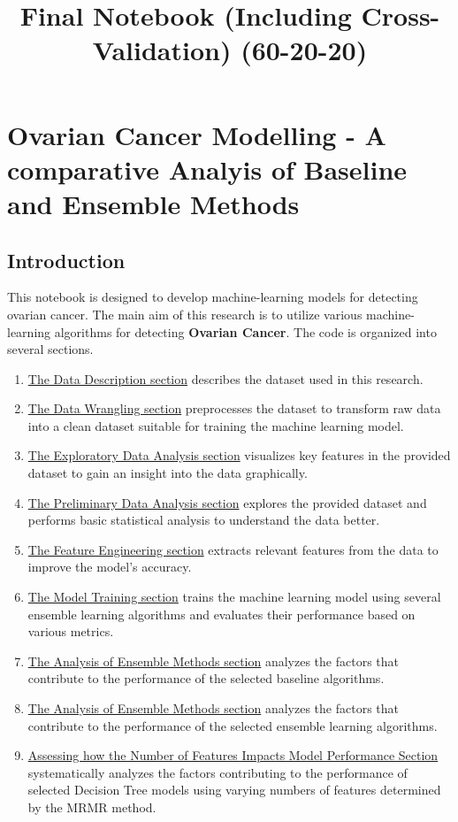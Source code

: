\documentclass[11pt]{article}
\title{Final Notebook (Including Cross-Validation) (60-20-20)}
\begin{document}
    
    \maketitle
    
    

    
    \section{Ovarian Cancer Modelling - A comparative Analyis of Baseline
and Ensemble
Methods}\label{ovarian-cancer-modelling---a-comparative-analyis-of-baseline-and-ensemble-methods}

    \subsection{Introduction}\label{introduction}

This notebook is designed to develop machine-learning models for
detecting ovarian cancer. The main aim of this research is to utilize
various machine-learning algorithms for detecting \textbf{Ovarian
Cancer}. The code is organized into several sections.

\begin{enumerate}
\def\labelenumi{\arabic{enumi}.}
\item
  \hyperref[data-description]{The Data Description section} describes
  the dataset used in this research.
\item
  \hyperref[data_wrang]{The Data Wrangling section} preprocesses the
  dataset to transform raw data into a clean dataset suitable for
  training the machine learning model.
\item
  \hyperref[data_viz]{The Exploratory Data Analysis section} visualizes
  key features in the provided dataset to gain an insight into the data
  graphically.
\item
  \hyperref[data_anal]{The Preliminary Data Analysis section} explores
  the provided dataset and performs basic statistical analysis to
  understand the data better.
\item
  \hyperref[feature]{The Feature Engineering section} extracts relevant
  features from the data to improve the model's accuracy.
\item
  \hyperref[training]{The Model Training section} trains the machine
  learning model using several ensemble learning algorithms and
  evaluates their performance based on various metrics.
\item
  \hyperref[baseline_model_anal]{The Analysis of Ensemble Methods section}
  analyzes the factors that contribute to the performance of the
  selected baseline algorithms.
\item
  \hyperref[model_anal]{The Analysis of Ensemble Methods section}
  analyzes the factors that contribute to the performance of the
  selected ensemble learning algorithms.
\item
  \hyperref[model_perf_assessment]{Assessing how the Number of Features Impacts Model Performance Section}
  systematically analyzes the factors contributing to the performance of
  selected Decision Tree models using varying numbers of features
  determined by the MRMR method.
\end{enumerate}
\end{document}
